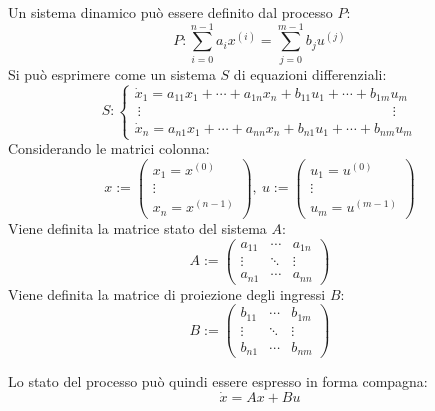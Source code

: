 \documentclass{article}
\numberwithin{equation}{subsection}
\begin{document}
Un sistema dinamico può essere definito dal processo $P$:
\begin{equation*}
    P:\displaystyle\sum_{i=0}^{n-1}a_ix^{(i)}=\sum_{j=0}^{m-1}b_ju^{(j)}
\end{equation*}
Si può esprimere come un sistema $S$ di equazioni differenziali:
\begin{equation*}
    S:
    \begin{cases}
        \dot x_1=a_{11}x_1+\cdots+a_{1n}x_n+b_{11}u_1+\cdots+b_{1m}u_m\\
        \:\vdots \qquad\qquad\qquad\qquad\qquad\qquad\qquad\qquad\qquad \vdots\\
        \dot x_n=a_{n1}x_1+\cdots+a_{nn}x_n+b_{n1}u_1+\cdots+b_{nm}u_m
    \end{cases}
\end{equation*}
Considerando le matrici colonna:
\begin{equation*}
    x:=
    \begin{pmatrix}
        x_1=x^{(0)}\\
        \vdots\\
        x_n=x^{(n-1)}
    \end{pmatrix}
    ,\:
    u:=
    \begin{pmatrix}
        u_1=u^{(0)}\\
        \vdots\\
        u_m=u^{(m-1)}
    \end{pmatrix}
\end{equation*}
Viene definita la matrice stato del sistema $A$:
\begin{equation*}
    A:=
    \begin{pmatrix}
        a_{11}& \cdots &a_{1n}\\
        \vdots & \ddots & \vdots\\
        a_{n1} & \cdots&a_{nn}
    \end{pmatrix}
\end{equation*}
Viene definita la matrice di proiezione degli ingressi $B$:
\begin{equation*}
    B:=
    \begin{pmatrix}
        b_{11}& \cdots &b_{1m}\\
        \vdots & \ddots & \vdots\\
        b_{n1} & \cdots&b_{nm}
    \end{pmatrix}
\end{equation*}


Lo stato del processo può quindi essere espresso in forma compagna:
\begin{equation*}
    \dot x=Ax+Bu
\end{equation*}
\end{document}
